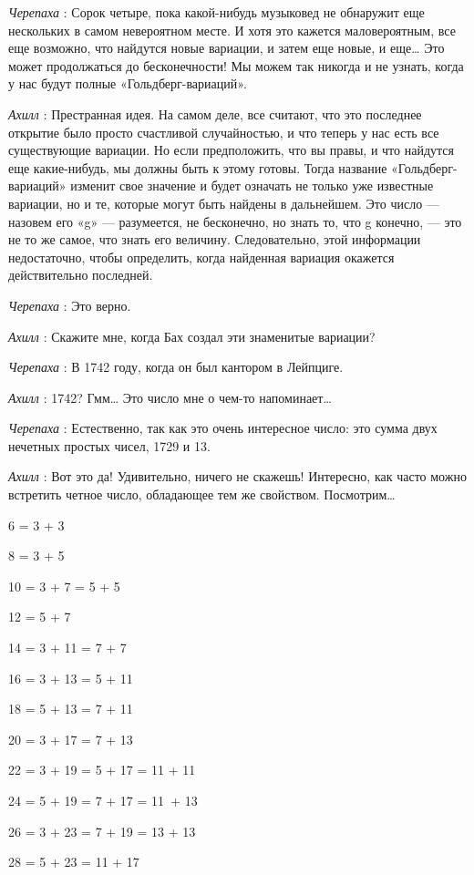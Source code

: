 \documentclass[../main.tex]{subfiles}
\begin{document}
\begin{dialogue}
\emph{Черепаха} : Сорок четыре, пока какой-нибудь музыковед не обнаружит еще нескольких в самом невероятном месте. И хотя это кажется маловероятным, все еще возможно, что найдутся новые вариации, и затем еще новые, и еще\ldots{} Это может продолжаться до бесконечности! Мы можем так никогда и не узнать, когда у нас будут полные «Гольдберг-вариаций».

\emph{Ахилл} : Престранная идея. На самом деле, все считают, что это последнее открытие было просто счастливой случайностью, и что теперь у нас есть все существующие вариации. Но если предположить, что вы правы, и что найдутся еще какие-нибудь, мы должны быть к этому готовы. Тогда название «Гольдберг-вариаций» изменит свое значение и будет означать не только уже известные вариации, но и те, которые могут быть найдены в дальнейшем. Это число --- назовем его «g» --- разумеется, не бесконечно, но знать то, что g конечно, --- это не то же самое, что знать его величину. Следовательно, этой информации недостаточно, чтобы определить, когда найденная вариация окажется действительно последней.

\emph{Черепаха} : Это верно.

\emph{Ахилл} : Скажите мне, когда Бах создал эти знаменитые вариации?

\emph{Черепаха} : В 1742 году, когда он был кантором в Лейпциге.

\emph{Ахилл} : 1742? Гмм\ldots{} Это число мне о чем-то напоминает\ldots{}

\emph{Черепаха} : Естественно, так как это очень интересное число: это сумма двух нечетных простых чисел, 1729 и 13.

\emph{Ахилл} : Вот это да! Удивительно, ничего не скажешь! Интересно, как часто можно встретить четное число, обладающее тем же свойством. Посмотрим\ldots{}

6 = 3 + 3

8 = 3 + 5

10 = 3 + 7 = 5 + 5

12 = 5 + 7

14 = 3 + 11 = 7 + 7

16 = 3 + 13 = 5 + 11

18 = 5 + 13 = 7 + 11

20 = 3 + 17 = 7 + 13

22 = 3 + 19 = 5 + 17 = 11 + 11

24 = 5 + 19 = 7 + 17 = 11~+ 13

26 = 3 + 23 = 7 + 19 = 13 + 13

28 = 5 + 23 = 11 + 17


\end{dialogue}
\end{document}
